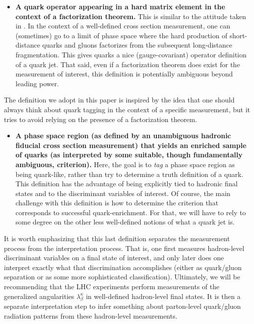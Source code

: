 \documentclass[11pt,letterpaper]{article}
\begin{document}
\begin{itemize}
\item \textbf{A quark operator appearing in a hard matrix element in the context of a factorization theorem.}  This is similar to the attitude taken in \cite{}.  In the context of a well-defined cross section measurement, one can (sometimes) go to a limit of phase space where the hard production of short-distance quarks and gluons factorizes from the subsequent long-distance fragmentation.  This gives quarks a nice (gauge-covariant) operator definition of a quark jet.  That said, even if a factorization theorem does exist for the measurement of interest, this definition is potentially ambiguous beyond leading power.
\end{itemize}
The definition we adopt in this paper is inspired by the idea that one should always think about quark tagging in the context of a specific measurement, but it tries to avoid relying on the presence of a factorization theorem.
\begin{itemize}
\item \textbf{A phase space region (as defined by an unambiguous hadronic fiducial cross section measurement) that yields an enriched sample of quarks (as interpreted by some suitable, though fundamentally ambiguous, criterion).}  Here, the goal is to \emph{tag} a phase space region as being quark-like, rather than try to determine a truth definition of a quark.  This definition has the advantage of being explicitly tied to hadronic final states and to the discriminant variables of interest.   Of course, the main challenge with this definition is how to determine the criterion that corresponds to successful quark-enrichment.  For that, we will have to rely to some degree on the other less well-defined notions of what a quark jet is.
\end{itemize}  

It is worth emphasizing that this last definition separates the measurement process from the interpretation process.  That is, one first measures hadron-level discriminant variables on a final state of interest, and only later does one interpret exactly what that discrimination accomplishes (either as quark/gluon separation or as some more sophisticated classification).  Ultimately, we will be recommending that the LHC experiments perform measurements of the generalized angularities $\lambda_\beta^\kappa$ in well-defined hadron-level final states.  It is then a separate interpretation step to infer something about parton-level quark/gluon radiation patterns from these hadron-level measurements.
\end{document}
